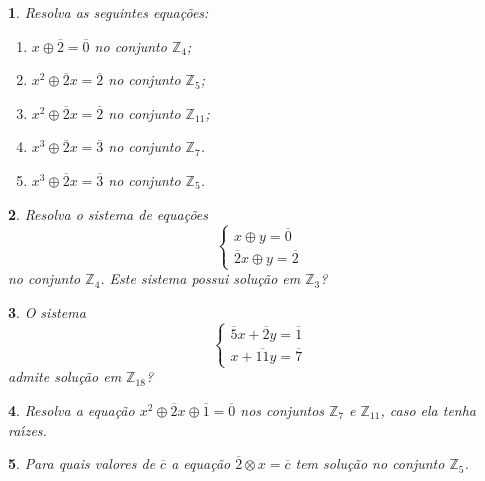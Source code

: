 \documentclass[12pt]{exam}
\newtheorem{exercicio}{}
\newcommand{\z}{\mathbb{Z}}
\begin{document}
\begin{exercicio}
Resolva as seguintes equa\c{c}\~oes:
\begin{enumerate}[label={\alph*})]
  \item $x \oplus \overline{2} = \overline{0}$ no conjunto $\z_4$;
  \item $x^2 \oplus \overline{2}x = \overline{2}$ no conjunto $\z_5$;
  \item $x^2 \oplus \overline{2}x = \overline{2}$ no conjunto $\z_11$;
  \item $x^3 \oplus \overline{2}x = \overline{3}$ no conjunto $\z_7$.
  \item $x^3 \oplus \overline{2}x = \overline{3}$ no conjunto $\z_5$.
\end{enumerate}
\end{exercicio}

\begin{exercicio}
  Resolva o sistema de equa\c{c}\~oes
  \[
    \begin{cases}
      x \oplus y = \overline{0}\\
      \overline{2}x \oplus y = \overline{2}
    \end{cases}
  \]
  no conjunto $\z_4$. Este sistema possui solu\c{c}\~ao em $\z_3$?
\end{exercicio}

\begin{exercicio}
  O sistema
  \[
    \begin{cases}
      \overline{5}x + \overline{2}y = \overline{1}\\
      x + \overline{11}y = \overline{7}
    \end{cases}
  \]
  admite solu\c{c}\~ao em $\z_{18}$?
\end{exercicio}

\begin{exercicio}
  Resolva a equa\c{c}\~ao $x^2 \oplus \overline{2}x \oplus \overline{1} = \overline{0}$ nos conjuntos $\z_7$ e $\z_{11}$, caso ela tenha ra{\'\i}zes.
\end{exercicio}

\begin{exercicio}
  Para quais valores de $\overline{c}$ a equa\c{c}\~ao $\overline{2}\otimes x = \overline{c}$ tem solu\c{c}\~ao no conjunto $\z_5$.
\end{exercicio}
\end{document}
